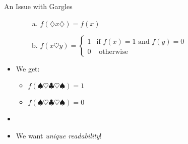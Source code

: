 \begin{frame}{An Issue with Gargles}
\begin{itemize}
\begin{enumerate}[(i)]
\begin{enumerate}[(a)]
				\item $f(\diamondsuit x\diamondsuit)=f(x)$
				
				\item $f(x\heartsuit y)=\begin{cases}
			1 & \text{if }f(x)=1\text{ and }f(y)=0\\
			0 &\text{ otherwise}
			\end{cases}$
			
			\end{enumerate}
			
		\end{enumerate}	
					
		\item We get: 
		
		\begin{itemize}
		
			\item $f(\spadesuit\heartsuit\clubsuit\heartsuit\spadesuit)=1$ 
			
			\item $f(\spadesuit\heartsuit\clubsuit\heartsuit\spadesuit)=0$
		
		\end{itemize}
		
		\item \frownie
		
		\item We want \emph{unique readability}!
		
	\end{itemize}


\end{frame}

